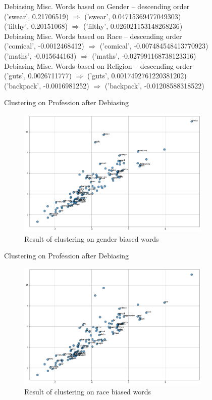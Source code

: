 \documentclass{beamer}
\begin{document}
	\begin{frame}
		Debiasing Misc. Words based on Gender  -- descending order \\
		('swear', 0.21706519) $\Rightarrow$ ('swear', 0.04715369477049303)
		\\	
		('filthy', 0.20151068) $\Rightarrow$ ('filthy', 0.026021153148268236)
		\\
		Debiasing Misc. Words based on Race  -- descending order \\
		('comical', -0.0012468412) $\Rightarrow$ ('comical', -0.007484548413770923)
		\\	
		('maths', -0.015644163) $\Rightarrow$ ('maths', -0.027991168738123316)
		\\
		Debiasing Misc. Words based on Religion  -- descending order \\
		('guts', 0.0026711777) $\Rightarrow$ ('guts', 0.0017492761220381202)
		\\	
		('backpack', -0.0016981252) $\Rightarrow$ ('backpack', -0.01208588318522)
	\end{frame}
	\begin{frame}{Clustering on Profession after Debiasing}
		\vspace{3mm}
		\begin{figure}[H]
			\centerline{\includegraphics[width=25em]{dwe4.png}}
			\caption{Result of clustering on gender biased words}
			\label{profession-debias-fig}
		\end{figure}
	\end{frame}
\begin{frame}{Clustering on Profession after Debiasing}
	\vspace{3mm}
	\begin{figure}[H]
		\centerline{\includegraphics[width=25em]{dwe5.png}}
		\caption{Result of clustering on race biased words}
		\label{profession-debias-fig}
	\end{figure}
\end{frame}
\end{document}
